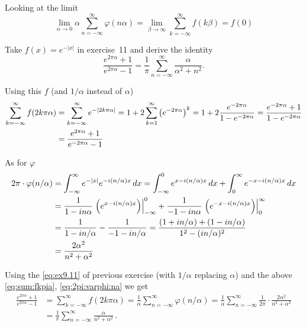 \begin{enumerate}
Looking at the limit
\begin{equation*}
\lim_{\alpha\to 0} \alpha \sum_{n = -\infty}^\infty \varphi(n\alpha)
= \lim_{\beta\to \infty} \sum_{k = -\infty}^\infty f(k\beta) 
= f(0)
\end{equation*}

\begin{excopy}
Take \(f(x) = e^{-|x|}\) in exercise~11 and derive the identity
\begin{equation*}
\frac{e^{2\pi\alpha} + 1}{e^{2\pi\alpha} - 1}
= \frac{1}{\pi} \sum_{n=-\infty}^\infty \frac{\alpha}{\alpha^2 + n^2}.
\end{equation*}
\end{excopy}

Using this $f$ (and \(1/\alpha\) instead of \(\alpha\))
\begin{align}
\sum_{k = -\infty}^\infty f(2k\pi\alpha) 
&= \sum_{k = -\infty}^\infty e^{-|2k\pi\alpha|}
= 1 + 2\sum_{k = 1}^\infty \left(e^{-2\pi\alpha}\right)^k
= 1 + 2\frac{e^{-2\pi\alpha}}{1 - e^{-2\pi\alpha}}
= \frac{e^{-2\pi\alpha} + 1}{1 - e^{-2\pi\alpha}} \notag \\
&= \frac{e^{2\pi\alpha} + 1}{e^{-2\pi\alpha}-1}  \label{eq:sum:fkpia}
\end{align}

As for \(\varphi\)
\begin{align}
2\pi\cdot\varphi(n/\alpha)
&= \int_{-\infty}^\infty e^{-|x|}e^{-i(n/\alpha)x}\,dx
 =   \int_{-\infty}^0 e^{x-i(n/\alpha)x}\,dx
   + \int_0^\infty e^{-x-i(n/\alpha)x}\,dx \notag \\
&=  \frac{1}{1-in\alpha}\left.\left(e^{x-i(n/\alpha)x}\right)\right|_{-\infty}^0
  + \frac{1}{-1-in\alpha}\left.\left(e^{-x-i(n/\alpha)x}\right)\right|_0^\infty 
     \notag \\
&=  \frac{1}{1-in/\alpha} - \frac{1}{-1-in/\alpha}
 =  \frac{(1 + in/\alpha) + (1 - in/\alpha)}{1^2 - (in/\alpha)^2} \notag \\
&= \frac{2\alpha^2}{n^2+\alpha^2}  \label{eq:2pi:varphi:na}
\end{align}

Using the \eqref{eq:ex9.11} of previous exercise 
(with \(1/\alpha\) replacing \(\alpha\)) 
and the above
\eqref{eq:sum:fkpia},
\eqref{eq:2pi:varphi:na} 
we get
\begin{align*} 
\frac{e^{2\pi\alpha} + 1}{e^{2\pi\alpha} - 1}
&= \sum_{k = -\infty}^\infty f(2k\pi\alpha) 
= \frac{1}{\alpha} \sum_{n = -\infty}^\infty \varphi(n/\alpha)
= \frac{1}{\alpha} 
     \sum_{n = -\infty}^\infty 
        \frac{1}{2\pi}\cdot \frac{2\alpha^2}{n^2+\alpha^2} \\
&= \frac{1}{\pi} \sum_{n = -\infty}^\infty  \frac{\alpha}{n^2+\alpha^2}\,.
\end{align*}



\end{enumerate}
